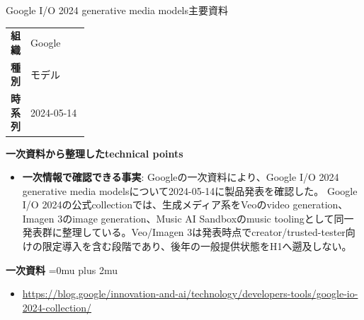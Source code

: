 \begin{technicalnote}{Google I/O 2024 generative media models}{主要資料}
\begingroup
\begin{tabularx}{\linewidth}{@{}>{\bfseries}p{0.22\linewidth}X@{}}
組織 & Google \\
種別 & モデル \\
時系列 & 2024-05-14 \\
\end{tabularx}
\smallskip
\begin{minipage}{\linewidth}
{\bfseries 一次資料から整理したtechnical points}
\begin{itemize}[leftmargin=1.5em,itemsep=0.35em]
\item \textbf{一次情報で確認できる事実}: Googleの一次資料により、Google I/O 2024 generative media modelsについて2024-05-14に製品発表を確認した。 Google I/O 2024の公式collectionでは、生成メディア系をVeoのvideo generation、Imagen 3のimage generation、Music AI Sandboxのmusic toolingとして同一発表群に整理している。Veo/Imagen 3は発表時点でcreator/trusted-tester向けの限定導入を含む段階であり、後年の一般提供状態をH1へ遡及しない。
\end{itemize}
\begin{minipage}{\linewidth}
\begin{samepage}
{\bfseries 一次資料}
\begingroup\sloppy
\Urlmuskip=0mu plus 2mu\relax
\begin{itemize}[leftmargin=1.5em,itemsep=0.25em]
\item {\scriptsize\url{https://blog.google/innovation-and-ai/technology/developers-tools/google-io-2024-collection/}}
\end{itemize}
\endgroup
\end{samepage}
\end{minipage}
\end{minipage}
\endgroup
\end{technicalnote}
\medskip

